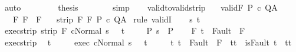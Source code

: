 \begin{isabellebody}
\ auto\isanewline
\ \ \ \ \isamarkupfalse%
\ {\isacharasterisk}\ \isamarkupfalse%
\ {\isacharquery}thesis\isanewline
\ \ \ \ \ \ \isamarkupfalse%
\ simp\isanewline
\ \ \isamarkupfalse%
\isanewline
{}\isamarkupfalse%
%
\endisatagproof
{\isafoldproof}%
%
\isadelimproof
\isanewline
%
\endisadelimproof
\isanewline
\isanewline
{}\isamarkupfalse%
\ valid{\isacharunderscore}to{\isacharunderscore}valid{\isacharunderscore}strip{\isacharcolon}\isanewline
\ \ \ valid{\isacharcolon}{\isachardoublequoteopen}{\isasymGamma}{\isasymTurnstile}\isactrlbsub {\isacharslash}F\isactrlesub \ P\ c\ Q{\isacharcomma}A{\isachardoublequoteclose}\isanewline
\ \ \ F{\isacharprime}{\isacharcolon}\ {\isachardoublequoteopen}F{\isacharprime}\ {\isasymsubseteq}\ {\isacharminus}F{\isachardoublequoteclose}\isanewline
\ \ \ {\isachardoublequoteopen}strip\ F{\isacharprime}\ {\isasymGamma}{\isasymTurnstile}\isactrlbsub {\isacharslash}F\isactrlesub \ P\ c\ Q{\isacharcomma}A{\isachardoublequoteclose}\isanewline
%
\isadelimproof
%
\endisadelimproof
%
\isatagproof
{}\isamarkupfalse%
\ {\isacharparenleft}rule\ validI{\isacharparenright}\isanewline
\ \ \isamarkupfalse%
\ s\ t\isanewline
\ \ \isamarkupfalse%
\ exec{\isacharunderscore}strip{\isacharcolon}\ {\isachardoublequoteopen}strip\ F{\isacharprime}\ {\isasymGamma}{\isasymturnstile}{\isasymlangle}c{\isacharcomma}Normal\ s\ {\isasymrangle}\ {\isasymRightarrow}\ t{\isachardoublequoteclose}\ \isanewline
\ \ \isamarkupfalse%
\ P{\isacharcolon}\ {\isachardoublequoteopen}s\ {\isasymin}\ P{\isachardoublequoteclose}\isanewline
\ \ \isamarkupfalse%
\ F{\isacharcolon}\ {\isachardoublequoteopen}t\ {\isasymnotin}\ Fault\ {\isacharbackquote}\ F{\isachardoublequoteclose}\isanewline
\ \ \isamarkupfalse%
\ exec{\isacharunderscore}strip\ \isamarkupfalse%
\ t{\isacharprime}\ \isanewline
\ \ \ \ exec{\isacharcolon}\ {\isachardoublequoteopen}{\isasymGamma}{\isasymturnstile}{\isasymlangle}c{\isacharcomma}Normal\ s\ {\isasymrangle}\ {\isasymRightarrow}\ t{\isacharprime}{\isachardoublequoteclose}\ \isanewline
\ \ \ \ t{\isacharprime}{\isacharcolon}\ {\isachardoublequoteopen}t{\isacharprime}\ {\isasymin}\ Fault\ {\isacharbackquote}\ {\isacharparenleft}{\isacharminus}F{\isacharprime}{\isacharparenright}\ {\isasymlongrightarrow}\ t{\isacharprime}{\isacharequal}t{\isachardoublequoteclose}\ {\isachardoublequoteopen}{\isasymnot}\ isFault\ t{\isacharprime}\ {\isasymlongrightarrow}\ t{\isacharprime}{\isacharequal}t{\isachardoublequoteclose}\isanewline

\end{isabellebody}
